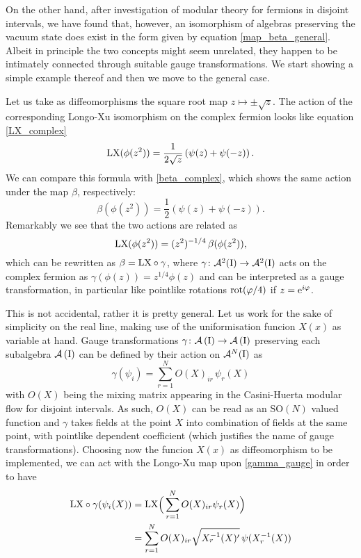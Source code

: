 \bigskip
On the other hand, after investigation of modular 
theory for fermions in disjoint intervals, we have 
found that, however, an isomorphism of algebras 
preserving the vacuum state does exist in the form 
given by equation \eqref{map_beta_general}. 
Albeit in principle the two concepts might seem 
unrelated, they happen to
be intimately connected through suitable gauge 
transformations. We start showing a simple example 
thereof and then we move to the general case.
\begin{example}
Let us take as diffeomorphisms the square root 
map $z\mapsto \pm\sqrt{z}$. The action of the 
corresponding Longo-Xu isomorphism 
on the complex fermion looks like equation
\eqref{LX_complex}
\[
\textrm{LX}(\phi(z^2))=\frac{1}{2\sqrt{z}}
\left(\psi(z)+\psi(-z)\right).
\]
We can compare this formula with \eqref{beta_complex}, which
shows the same action under the map $\beta$, respectively:
\[
\beta(\phi(z^2))=\frac{1}{2}
\left(\psi(z)+\psi(-z)\right).
\]
Remarkably we see that the two actions are related as 
\[ 
\textrm{LX}(\phi(z^2))=(z^2)^{-1/4}\,
\beta(\phi(z^2)),
\]
which can be rewritten as $\beta=\textrm{LX}\circ \gamma$,
where $\gamma\colon\mathcal{A}^2(\textrm{I})\to\mathcal{A}^2(\textrm{I})$
acts on the complex fermion as $\gamma(\phi(z))=z^{1/4}
\phi(z)$ and can be interpreted as a
gauge transformation, in particular like pointlike 
rotations $\operatorname{rot}(\varphi/4)$
if $z=\operatorname{e}^{i\varphi}$.
\end{example}
This is not accidental, rather it is pretty general.
Let us work for the sake of simplicity on the real line,
making use of the uniformisation funcion $X(x)$ as variable
at hand. Gauge transformations $\gamma\colon\mathcal{A}\left(\textrm{I}\right)\to\mathcal{A}\left(\textrm{I}\right)$
preserving each subalgebra $\mathcal{A}\left(\textrm{I}\right)$ can be defined 
by their action on $\mathcal{A}^N(\textrm{I})$ as
\begin{equation}
\label{gamma_gauge}
\gamma(\psi_i)=\sum^N_{r=1}O(X)_{ir}\,\psi_r(X)
\end{equation}
with $O(X)$ being the mixing matrix appearing in the
Casini-Huerta modular flow for disjoint intervals. 
As such, $O(X)$ can be read as an $\textrm{SO}(N)$ 
valued function and $\gamma$ takes fields at the point
$X$ into combination of fields at the same point, with 
pointlike dependent coefficient (which justifies the 
name of gauge transformations). Choosing now the 
funcion $X(x)$ as diffeomorphism to be implemented, 
we can act with the Longo-Xu map upon
\eqref{gamma_gauge} in order to have 
\begin{align*}
\textrm{LX}\circ\gamma(\psi_i(X))&=\textrm{LX}\Big(\sum^N_{r=1}O(X)_{ir}
\psi_r(X)\Big)\\
&=\sum^N_{r=1}O(X)_{ir}\sqrt{X_r^{-1}(X)'}
\,\psi(X_r^{-1}(X))
\end{align*}
